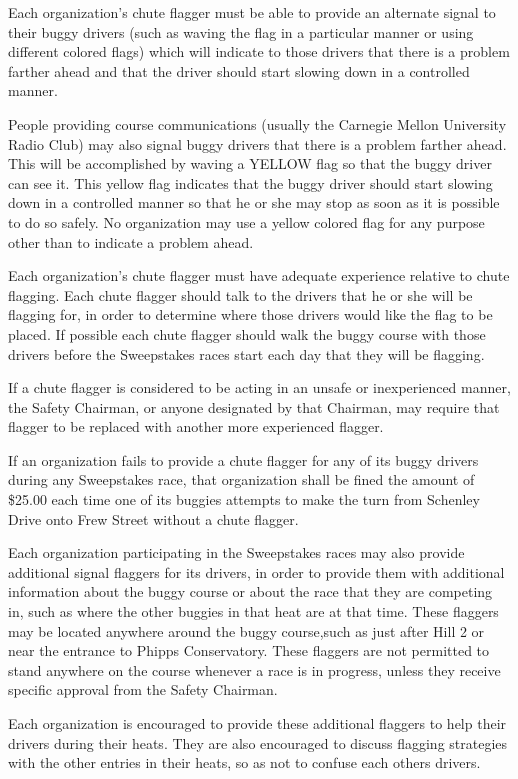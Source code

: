 Each organization's chute flagger must be able to provide an alternate signal to their buggy drivers (such as waving the flag in a particular manner or using different colored flags) which will indicate to those drivers that there is a problem farther ahead and that the driver should start slowing down in a controlled manner.

People providing course communications (usually the Carnegie Mellon University Radio Club) may also signal buggy drivers that there is a problem farther ahead. This will be accomplished by waving a YELLOW flag so that the buggy driver can see it. This yellow flag indicates that the buggy driver should start slowing down in a controlled manner so that he or she may stop as soon as it is possible to do so safely. No organization may use a yellow colored flag for any purpose other than to indicate a problem ahead.

Each organization's chute flagger must have adequate experience relative to chute flagging. Each chute flagger should talk to the drivers that he or she will be flagging for, in order to determine where those drivers would like the flag to be placed. If possible each chute flagger should walk the buggy course with those drivers before the Sweepstakes races start each day that they will be flagging.

If a chute flagger is considered to be acting in an unsafe or inexperienced manner, the Safety Chairman, or anyone designated by that Chairman, may require that flagger to be replaced with another more experienced flagger.

If an organization fails to provide a chute flagger for any of its buggy drivers during any Sweepstakes race, that organization shall be fined the amount of \$25.00 each time one of its buggies attempts to make the turn from Schenley Drive onto Frew Street without a chute flagger.

Each organization participating in the Sweepstakes races may also provide additional signal flaggers for its drivers, in order to provide them with additional information about the buggy course or about the race that they are competing in, such as where the other buggies in that heat are at that time. These flaggers may be located anywhere around the buggy course,such as just after Hill 2 or near the entrance to Phipps Conservatory. These flaggers are not permitted to stand anywhere on the course whenever a race is in progress, unless they receive specific approval from the Safety Chairman.

Each organization is encouraged to provide these additional flaggers to help their drivers during their heats. They are also encouraged to discuss flagging strategies with the other entries in their heats, so as not to confuse each others drivers.

